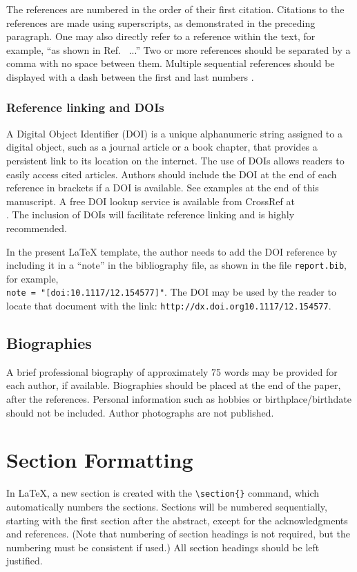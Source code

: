 \documentclass[12pt]{spieman}  %
\begin{document}
\begin{spacing}{2}
The references are numbered in the order of their first citation. Citations to the references are made using superscripts, as demonstrated in the preceding paragraph. One may also directly refer to a reference within the text, for example, ``as shown in Ref.~ ...''  Two or more references should be separated by a comma with no space between them. Multiple sequential references should be displayed with a dash between the first and last numbers \cite{Alred03,Perelman97,Lamport94,Goossens97,Metropolis53}.

\subsubsection{Reference linking and DOIs}
A Digital Object Identifier (DOI) is a unique alphanumeric string assigned to a digital object, such as a journal article or a book chapter, that provides a persistent link to its location on the internet. The use of DOIs allows readers to easily access cited articles. Authors should include the DOI at the end of each reference in brackets if a DOI is available. See examples at the end of this manuscript. A free DOI lookup service is available from CrossRef at \\. The inclusion of DOIs will facilitate reference linking and is highly recommended.

In the present LaTeX template, the author needs to add the DOI reference by including it in a ``note'' in the bibliography file, as shown in the file {\verb+report.bib+}, for example, \\ {\verb+note = "[doi:10.1117/12.154577]"+}. The DOI may be used by the reader to locate that document with the link: {\verb+http://dx.doi.org10.1117/12.154577+}.

\subsection{Biographies}
A brief professional biography of approximately 75 words may be provided for each author, if available. Biographies should be placed at the end of the paper, after the references. Personal information such as hobbies or birthplace/birthdate should not be included. Author photographs are not published.

\section{Section Formatting}
\label{sect:sections}
In LaTeX, a new section is created with the \verb|\section{}| command, which automatically numbers the sections. Sections will be numbered sequentially, starting with the first section after the abstract, except for the acknowledgments and references. (Note that numbering of section headings is not required, but the numbering must be consistent if used.) All section headings should be left justified.


\end{spacing}
\end{document}
